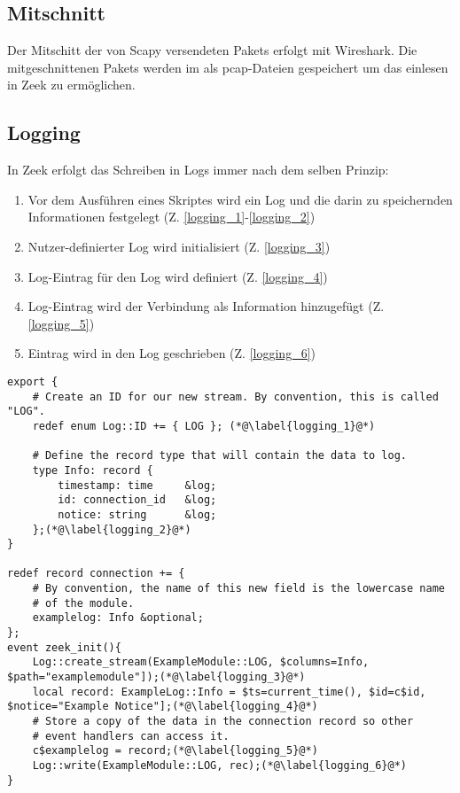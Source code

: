 \subsection{Mitschnitt}
Der Mitschitt der von Scapy versendeten Pakets erfolgt mit Wireshark. Die mitgeschnittenen Pakets werden im als pcap-Dateien gespeichert um das einlesen in Zeek zu ermöglichen.


\subsection{Logging}
In Zeek erfolgt das Schreiben in Logs immer nach dem selben Prinzip:
\begin{enumerate}
\item{Vor dem Ausführen eines Skriptes wird ein Log und die darin zu speichernden Informationen festgelegt (Z. \ref{logging_1}-\ref{logging_2})}
\item{Nutzer-definierter Log wird initialisiert (Z. \ref{logging_3})}
\item{Log-Eintrag für den Log wird definiert (Z. \ref{logging_4})}
\item{Log-Eintrag wird der Verbindung als Information hinzugefügt (Z. \ref{logging_5})}
\item{Eintrag wird in den Log geschrieben (Z. \ref{logging_6})}
\end{enumerate}
\begin{lstlisting}[caption={[Generierung einer Log-Datei]Generierung einer Log-Datei mit Verbindungsinformationen}]
export {
    # Create an ID for our new stream. By convention, this is called "LOG".
    redef enum Log::ID += { LOG }; (*@\label{logging_1}@*)	

    # Define the record type that will contain the data to log.
    type Info: record {
        timestamp: time		&log;
        id: connection_id	&log; 
        notice: string		&log;
    };(*@\label{logging_2}@*)
}

redef record connection += {
    # By convention, the name of this new field is the lowercase name
    # of the module.
    examplelog: Info &optional;
};
event zeek_init(){
	Log::create_stream(ExampleModule::LOG, $columns=Info, $path="examplemodule"]);(*@\label{logging_3}@*)
	local record: ExampleLog::Info = $ts=current_time(), $id=c$id, $notice="Example Notice"];(*@\label{logging_4}@*)
    # Store a copy of the data in the connection record so other
    # event handlers can access it.
    c$examplelog = record;(*@\label{logging_5}@*)
    Log::write(ExampleModule::LOG, rec);(*@\label{logging_6}@*)
}
\end{lstlisting}
